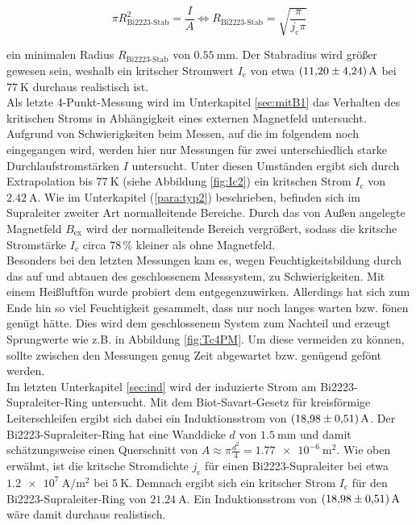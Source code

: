 \begin{equation*}
  \pi R_{\text{Bi2223-Stab}}^2 = \frac{I}{A}
  \iff
  R_{\text{Bi2223-Stab}} = \sqrt{\frac{\pi}{j_{\text{c}}\pi}}
\end{equation*}

\noindent
ein minimalen Radius $R_{\text{Bi2223-Stab}}$ von $\SI{0.55}{\milli\meter}$.
Der Stabradius wird größer gewesen sein, weshalb ein kritscher Stromwert
$I_{\text{c}}$ von etwa $\SI{11.2\pm4,24}{\ampere}$ bei $\SI{77}{\kelvin}$ durchaus
realistisch ist.\\
Als letzte 4-Punkt-Messung wird im Unterkapitel \ref{sec:mitB1} das Verhalten des
kritischen Stroms in Abhängigkeit eines externen Magnetfeld untersucht.
Aufgrund von Schwierigkeiten beim Messen, auf die im folgendem noch eingegangen wird,
werden hier nur Messungen für zwei unterschiedlich starke Durchlaufstromstärken $I$
untersucht. Unter diesen Umständen ergibt sich durch Extrapolation bis $\SI{77}{\kelvin}$
(siehe Abbildung \ref{fig:Ic2}) ein kritschen Strom $I_{\text{c}}$ von $\SI{2,42}{\ampere}$.
Wie im Unterkapitel (\ref{para:typ2}) beschrieben, befinden sich im Supraleiter zweiter Art
normalleitende Bereiche. Durch das von Außen angelegte Magnetfeld $B_{\text{ex}}$
wird der normalleitende Bereich vergrößert, sodass die kritsche Stromstärke
$I_{\text{c}}$ circa 78$\,$\% kleiner als ohne Magnetfeld.\\
Besonders bei den letzten Messungen kam es, wegen Feuchtigkeitsbildung durch das
auf und abtauen des geschlossenem Messsystem, zu Schwierigkeiten. Mit einem Heißluftfön
wurde probiert dem entgegenzuwirken. Allerdings hat sich zum Ende hin so viel
Feuchtigkeit gesammelt, dass nur noch langes warten bzw. fönen genügt hätte. Dies
wird dem geschlossenem System zum Nachteil und erzeugt Sprungwerte wie z.B. in
Abbildung \ref{fig:Tc4PM}. Um diese vermeiden zu können, sollte zwischen den
Messungen genug Zeit abgewartet bzw. genügend gefönt werden.\\
Im letzten Unterkapitel \ref{sec:ind} wird der induzierte Strom am Bi2223-Supraleiter-Ring
untersucht. Mit dem Biot-Savart-Gesetz für kreisförmige Leiterschleifen ergibt
sich dabei ein Induktionsstrom von $\SI{18,98\pm0.51}{\ampere}$. Der Bi2223-Supraleiter-Ring
hat eine Wanddicke $d$ von $\SI{1,5}{\milli\meter}$ und damit schätzungsweise einen
Querschnitt von $A \approx \pi \frac{d^2}{4} = \SI{1,77e-6}{\meter\squared}$.
Wie oben erwähnt, ist die kritsche Stromdichte $j_{\text{c}}$ für einen Bi2223-Supraleiter
bei etwa $\SI{1.2e7}{\ampere\per\metre\squared}$ bei $\SI{5}{\kelvin}$. Demnach
ergibt sich ein kritscher Strom $I_{\text{c}}$ für den Bi2223-Supraleiter-Ring
von $\SI{21,24}{\ampere}$. Ein Induktionsstrom von $\SI{18,98\pm0,51}{\ampere}$
wäre damit durchaus realistisch.
